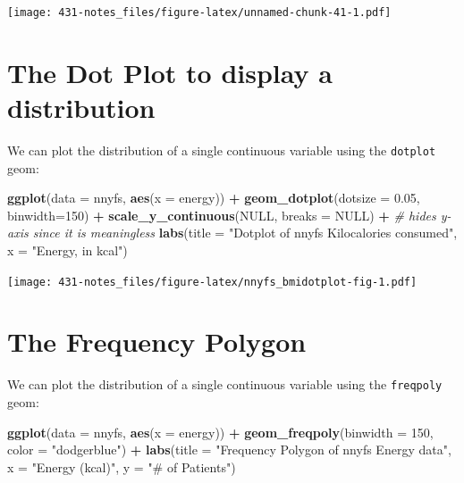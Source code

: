 \documentclass[
]{book}
\newenvironment{Shaded}{\begin{snugshade}}{\end{snugshade}}
\newcommand{\CommentTok}[1]{\textcolor[rgb]{0.56,0.35,0.01}{\textit{#1}}}
\newcommand{\DataTypeTok}[1]{\textcolor[rgb]{0.13,0.29,0.53}{#1}}
\newcommand{\DecValTok}[1]{\textcolor[rgb]{0.00,0.00,0.81}{#1}}
\newcommand{\FloatTok}[1]{\textcolor[rgb]{0.00,0.00,0.81}{#1}}
\newcommand{\KeywordTok}[1]{\textcolor[rgb]{0.13,0.29,0.53}{\textbf{#1}}}
\newcommand{\NormalTok}[1]{#1}
\newcommand{\OperatorTok}[1]{\textcolor[rgb]{0.81,0.36,0.00}{\textbf{#1}}}
\newcommand{\OtherTok}[1]{\textcolor[rgb]{0.56,0.35,0.01}{#1}}
\newcommand{\StringTok}[1]{\textcolor[rgb]{0.31,0.60,0.02}{#1}}
\begin{document}
\texttt{[image: 431-notes\_files/figure-latex/unnamed-chunk-41-1.pdf]}

\hypertarget{the-dot-plot-to-display-a-distribution}{%
\section{The Dot Plot to display a distribution}\label{the-dot-plot-to-display-a-distribution}}

We can plot the distribution of a single continuous variable using the \texttt{dotplot} geom:

\begin{Shaded}
\begin{Highlighting}[]
\KeywordTok{ggplot}\NormalTok{(}\DataTypeTok{data =}\NormalTok{ nnyfs, }\KeywordTok{aes}\NormalTok{(}\DataTypeTok{x =}\NormalTok{ energy)) }\OperatorTok{+}
\StringTok{    }\KeywordTok{geom_dotplot}\NormalTok{(}\DataTypeTok{dotsize =} \FloatTok{0.05}\NormalTok{, }\DataTypeTok{binwidth=}\DecValTok{150}\NormalTok{) }\OperatorTok{+}\StringTok{ }
\StringTok{    }\KeywordTok{scale_y_continuous}\NormalTok{(}\OtherTok{NULL}\NormalTok{, }\DataTypeTok{breaks =} \OtherTok{NULL}\NormalTok{) }\OperatorTok{+}\StringTok{ }\CommentTok{# hides y-axis since it is meaningless}
\StringTok{    }\KeywordTok{labs}\NormalTok{(}\DataTypeTok{title =} \StringTok{"Dotplot of nnyfs Kilocalories consumed"}\NormalTok{,}
         \DataTypeTok{x =} \StringTok{"Energy, in kcal"}\NormalTok{)}
\end{Highlighting}
\end{Shaded}

\texttt{[image: 431-notes\_files/figure-latex/nnyfs\_bmidotplot-fig-1.pdf]}

\hypertarget{the-frequency-polygon}{%
\section{The Frequency Polygon}\label{the-frequency-polygon}}

We can plot the distribution of a single continuous variable using the \texttt{freqpoly} geom:

\begin{Shaded}
\begin{Highlighting}[]
\KeywordTok{ggplot}\NormalTok{(}\DataTypeTok{data =}\NormalTok{ nnyfs, }\KeywordTok{aes}\NormalTok{(}\DataTypeTok{x =}\NormalTok{ energy)) }\OperatorTok{+}
\StringTok{    }\KeywordTok{geom_freqpoly}\NormalTok{(}\DataTypeTok{binwidth =} \DecValTok{150}\NormalTok{, }\DataTypeTok{color =} \StringTok{"dodgerblue"}\NormalTok{) }\OperatorTok{+}\StringTok{ }
\StringTok{    }\KeywordTok{labs}\NormalTok{(}\DataTypeTok{title =} \StringTok{"Frequency Polygon of nnyfs Energy data"}\NormalTok{,}
         \DataTypeTok{x =} \StringTok{"Energy (kcal)"}\NormalTok{, }\DataTypeTok{y =} \StringTok{"# of Patients"}\NormalTok{)}
\end{Highlighting}
\end{Shaded}
\end{document}
